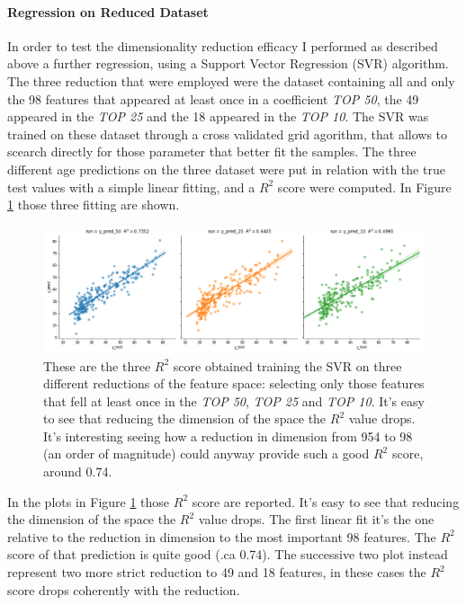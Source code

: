 \documentclass{article}
\begin{document}
\paragraph{Regression on Reduced Dataset}
In order to test the dimensionality reduction efficacy I performed as described above a further regression, using a Support Vector Regression (SVR) algorithm. The three reduction that were employed were the dataset containing all and only the 98 features that appeared at least once in a coefficient \emph{TOP 50}, the 49 appeared in the \emph{TOP 25} and the 18 appeared in the \emph{TOP 10}.
The SVR was trained on these dataset through a cross validated grid agorithm, that allows to scearch directly for those parameter that better fit the samples. The three different age predictions on the three dataset were put in relation with the true test values with a simple linear fitting, and a $R^2$ score were computed. In Figure \ref{fig:Brain_graphs} those three fitting are shown.

\begin{figure}[ht]
	\includegraphics[width=\textwidth]{three_graphs}
	\caption{These are the three $R^2$ score obtained training the SVR on three different reductions of the feature space: selecting only those features that fell at least once in the \emph{TOP 50}, \emph{TOP 25} and \emph{TOP 10}. It's easy to see that reducing the dimension of the space the $R^2$ value drops. It's interesting seeing how a reduction in dimension from 954 to 98 (an order of magnitude) could anyway provide such a good $R^2$ score, around 0.74.}
	\label{fig:Brain_graphs}
	\centering
\end{figure}

In the plots in Figure \ref{fig:Brain_graphs} those $R^2$ score are reported. It's easy to see that reducing the dimension of the space the $R^2$ value drops. The first linear fit it's the one relative to the reduction in dimension to the most important 98 features. The $R^2$ score of that prediction is quite good (.ca 0.74). The successive two plot instead represent two more strict reduction to 49 and 18 features, in these cases the $R^2$ score drops coherently with the reduction.
\end{document}
